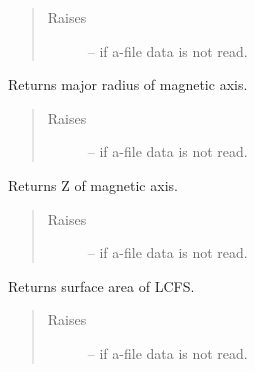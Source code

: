 \documentclass[letterpaper,10pt,english]{sphinxmanual}
\begin{document}
\begin{fulllineitems}
\begin{fulllineitems}
\begin{quote}
\begin{description}
\item[{Raises}] \leavevmode
{} -- if a-file data is not read.

\end{description}\end{quote}

\end{fulllineitems}


\begin{fulllineitems}
\label{eqtools:eqtools.eqdskreader.EqdskReader.getMagR}
Returns major radius of magnetic axis.
\begin{quote}\begin{description}
\item[{Raises}] \leavevmode
{} -- if a-file data is not read.

\end{description}\end{quote}

\end{fulllineitems}


\begin{fulllineitems}
\label{eqtools:eqtools.eqdskreader.EqdskReader.getMagZ}
Returns Z of magnetic axis.
\begin{quote}\begin{description}
\item[{Raises}] \leavevmode
{} -- if a-file data is not read.

\end{description}\end{quote}

\end{fulllineitems}


\begin{fulllineitems}
\label{eqtools:eqtools.eqdskreader.EqdskReader.getAreaLCFS}
Returns surface area of LCFS.
\begin{quote}\begin{description}
\item[{Raises}] \leavevmode
{} -- if a-file data is not read.


\end{description}
\end{quote}
\end{fulllineitems}
\end{fulllineitems}
\end{document}
